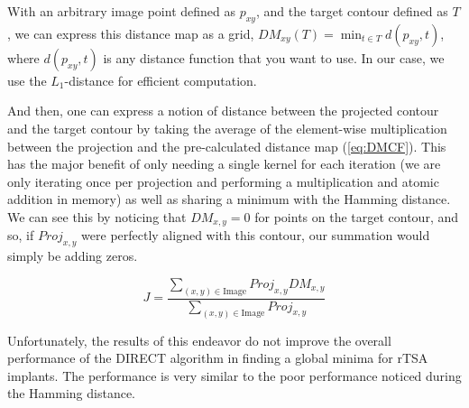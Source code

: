 With an arbitrary image point defined as $p_{xy}$, and the target contour defined as $T$, we can express this distance map as a grid, $\displaystyle DM_{xy}(T) = \min_{t\in T}d(p_{xy},t)$, where $d(p_{xy},t)$ is any distance function that you want to use. In our case, we use the $L_{1}$-distance for efficient computation.

And then, one can express a notion of distance between the projected contour and the target contour by taking the average of the element-wise multiplication between the projection and the pre-calculated distance map (\cref{eq:DMCF}).
This has the major benefit of only needing a single kernel for each iteration (we are only iterating once per projection and performing a multiplication and atomic addition in memory) as well as sharing a minimum with the Hamming distance.
We can see this by noticing that $DM_{x,y}=0$ for points on the target contour, and so, if $Proj_{x,y}$ were perfectly aligned with this contour, our summation would simply be adding zeros.

\begin{equation}
  \label{eq:DMCF}
  J = \dfrac{ \sum_{(x,y) \in \text{Image}} Proj_{x,y}DM_{x,y} }{\sum_{(x,y)\in \text{Image}}Proj_{x,y}}
\end{equation}

Unfortunately, the results of this endeavor do not improve the overall performance of the DIRECT algorithm in finding a global minima for rTSA implants.
The performance is very similar to the poor performance noticed during the Hamming distance.


